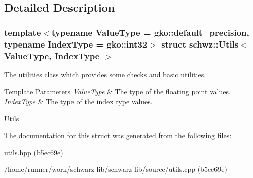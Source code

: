 \subsection{Detailed Description}
\subsubsection*{template$<$typename Value\+Type = gko\+::default\+\_\+precision, typename Index\+Type = gko\+::int32$>$\newline
struct schwz\+::\+Utils$<$ Value\+Type, Index\+Type $>$}

The utilities class which provides some checks and basic utilities. 


\begin{DoxyTemplParams}{Template Parameters}
{\em Value\+Type} & The type of the floating point values. \\
\hline
{\em Index\+Type} & The type of the index type values.\\
\hline
\end{DoxyTemplParams}
\hyperlink{group__utils}{Utils} 

The documentation for this struct was generated from the following files\+:\begin{DoxyCompactItemize}
\item 
utils.\+hpp (b5ec69e)\item 
/home/runner/work/schwarz-\/lib/schwarz-\/lib/source/utils.\+cpp (b5ec69e)\end{DoxyCompactItemize}
